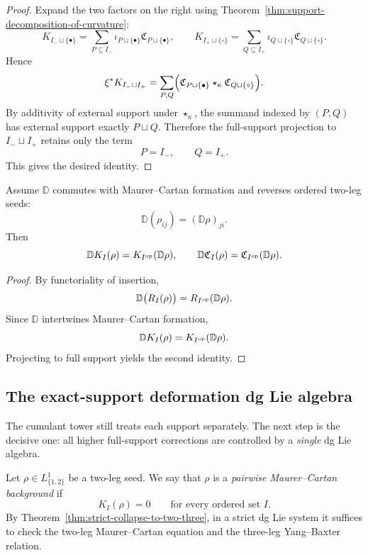 \begin{proof}
Expand the two factors on the right using Theorem~\ref{thm:support-decomposition-of-curvature}:
\[
K_{I_-\sqcup\{\bullet\}}
=
\sum_{P\subseteq I_-}
\iota_{P\sqcup\{\bullet\}}\mathfrak C_{P\sqcup\{\bullet\}},
\qquad
K_{I_+\sqcup\{\circ\}}
=
\sum_{Q\subseteq I_+}
\iota_{Q\sqcup\{\circ\}}\mathfrak C_{Q\sqcup\{\circ\}}.
\]
Hence
\[
\xi^*K_{I_-\sqcup I_+}
=
\sum_{P,Q}
\Bigl(
\mathfrak C_{P\sqcup\{\bullet\}}\star_\kappa
\mathfrak C_{Q\sqcup\{\circ\}}
\Bigr).
\]
By additivity of external support under $\star_\kappa$, the summand indexed by $(P,Q)$ has external
support exactly $P\sqcup Q$. Therefore the full-support projection to $I_-\sqcup I_+$ retains only the
term
\[
P=I_-,
\qquad
Q=I_+.
\]
This gives the desired identity.
\end{proof}

\begin{theorem}
\label{thm:verdier-transport-of-cumulants}
Assume $\mathbb D$ commutes with Maurer--Cartan formation and reverses ordered two-leg seeds:
\[
\mathbb D(\rho_{ij})=(\mathbb D\rho)_{ji}.
\]
Then
\[
\mathbb D K_I(\rho)=K_{I^{\mathrm{op}}}(\mathbb D\rho),
\qquad
\mathbb D\mathfrak C_I(\rho)=\mathfrak C_{I^{\mathrm{op}}}(\mathbb D\rho).
\]
\end{theorem}

\begin{proof}
By functoriality of insertion,
\[
\mathbb D\big(R_I(\rho)\big)=R_{I^{\mathrm{op}}}(\mathbb D\rho).
\]
Since $\mathbb D$ intertwines Maurer--Cartan formation,
\[
\mathbb D K_I(\rho)=K_{I^{\mathrm{op}}}(\mathbb D\rho).
\]
Projecting to full support yields the second identity.
\end{proof}

\subsection{The exact-support deformation dg Lie algebra}

The cumulant tower still treats each support separately. The next step is the decisive one:
all higher full-support corrections are controlled by a \emph{single} dg Lie algebra.

\begin{definition}
\label{def:pairwise-mc-background}
Let $\rho\in L_{\{1,2\}}^1$ be a two-leg seed. We say that $\rho$ is a
\emph{pairwise Maurer--Cartan background} if
\[
K_I(\rho)=0
\qquad\text{for every ordered set }I.
\]
By Theorem~\ref{thm:strict-collapse-to-two-three}, in a strict dg Lie system it suffices to check the
two-leg Maurer--Cartan equation and the three-leg Yang--Baxter relation.
\end{definition}

